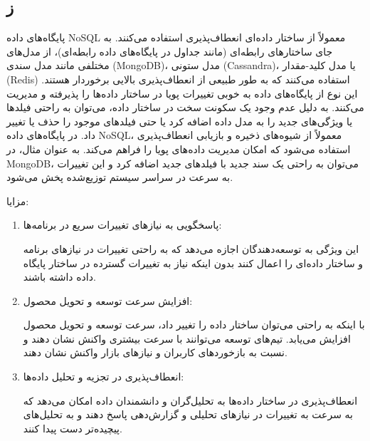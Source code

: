 \subsection*{ز}

پایگاه‌های داده NoSQL معمولاً از ساختار داده‌ای انعطاف‌پذیری استفاده می‌کنند. به جای ساختارهای رابطه‌ای (مانند جداول در پایگاه‌های داده رابطه‌ای)، از مدل‌های مختلفی مانند مدل سندی (MongoDB)، مدل ستونی (Cassandra)، یا مدل کلید-مقدار (Redis) استفاده می‌کنند که به طور طبیعی از انعطاف‌پذیری بالایی برخوردار هستند.
این نوع از پایگاه‌های داده به خوبی تغییرات پویا در ساختار داده‌ها را پذیرفته و مدیریت می‌کنند. به دلیل عدم وجود یک سکونت سخت در ساختار داده، می‌توان به راحتی فیلدها یا ویژگی‌های جدید را به مدل داده اضافه کرد یا حتی فیلدهای موجود را حذف یا تغییر داد.
در پایگاه‌های داده NoSQL، معمولاً از شیوه‌های ذخیره و بازیابی انعطاف‌پذیری استفاده می‌شود که امکان مدیریت داده‌های پویا را فراهم می‌کند. به عنوان مثال، در MongoDB، می‌توان به راحتی یک سند جدید با فیلدهای جدید اضافه کرد و این تغییرات به سرعت در سراسر سیستم توزیع‌شده پخش می‌شود.

مزایا:

\begin{enumerate}
	\item 	 پاسخگویی به نیازهای تغییرات سریع در برنامه‌ها:

	این ویژگی به توسعه‌دهندگان اجازه می‌دهد که به راحتی تغییرات در نیازهای برنامه و ساختار داده‌ای را اعمال کنند بدون اینکه نیاز به تغییرات گسترده در ساختار پایگاه داده داشته باشند.
	\item 	 افزایش سرعت توسعه و تحویل محصول:
	
	با اینکه به راحتی می‌توان ساختار داده را تغییر داد، سرعت توسعه و تحویل محصول افزایش می‌یابد. تیم‌های توسعه می‌توانند با سرعت بیشتری واکنش نشان دهند و نسبت به بازخوردهای کاربران و نیازهای بازار واکنش نشان دهند.
	\item 	 انعطاف‌پذیری در تجزیه و تحلیل داده‌ها:
	
	انعطاف‌پذیری در ساختار داده‌ها به تحلیل‌گران و دانشمندان داده امکان می‌دهد که به سرعت به تغییرات در نیازهای تحلیلی و گزارش‌دهی پاسخ دهند و به تحلیل‌های پیچیده‌تر دست پیدا کنند.
\end{enumerate}

